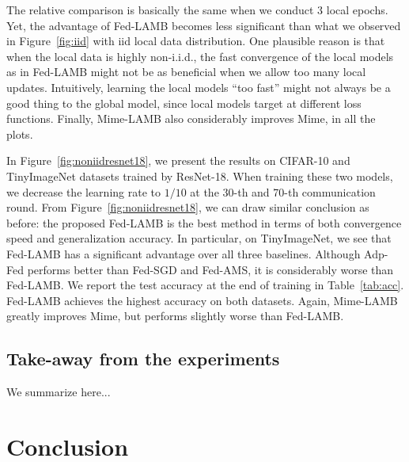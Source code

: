\documentclass[nohyperref]{article}
\theoremstyle{plain}
\theoremstyle{definition}
\theoremstyle{remark}
\begin{document}
The relative comparison is basically the same when we conduct 3 local epochs. Yet, the advantage of Fed-LAMB becomes less significant than what we observed in Figure~\ref{fig:iid} with iid local data distribution. One plausible reason is that when the local data is highly non-i.i.d., the fast convergence of the local models as in Fed-LAMB might not be as beneficial when we allow too many local updates. Intuitively, learning the local models ``too fast'' might not always be a good thing to the global model, since local models target at different loss functions.
Finally, Mime-LAMB also considerably improves Mime, in all the plots.





In Figure~\ref{fig:noniidresnet18}, we present the results on CIFAR-10 and TinyImageNet datasets trained by ResNet-18. When training these two models, we decrease the learning rate to $1/10$ at the 30-th and 70-th communication round. From Figure~\ref{fig:noniidresnet18}, we can draw similar conclusion as before: the proposed Fed-LAMB is the best method in terms of both convergence speed and generalization accuracy. In particular, on TinyImageNet, we see that Fed-LAMB has a significant advantage over all three baselines. Although Adp-Fed performs better than Fed-SGD and Fed-AMS, it is considerably worse than Fed-LAMB. We report the test accuracy at the end of training in Table~\ref{tab:acc}. Fed-LAMB achieves the highest accuracy on both datasets. Again, Mime-LAMB greatly improves Mime, but performs slightly worse than Fed-LAMB.




{\color{red} 
\subsection{Take-away from the experiments}
We summarize here...
} 


\section{Conclusion}\label{sec:conclusion}
\end{document}
